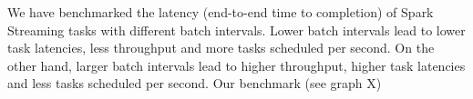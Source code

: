We have benchmarked the latency (end-to-end time to completion) of Spark Streaming tasks with different batch intervals. Lower batch intervals lead to lower task latencies, less throughput and more tasks scheduled per second. On the other hand, larger batch intervals lead to higher throughput, higher task latencies and less tasks scheduled per second. Our benchmark (see graph X)  

